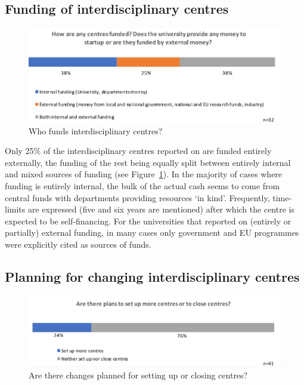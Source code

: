 \subsection{Funding of interdisciplinary centres}

\begin{figure}[h]
\centering
\includegraphics[width = \linewidth]{charts/5e.jpg}
\caption{Who funds interdisciplinary centres?}
\label{sect5:funding}
\end{figure}

Only 25\% of the interdisciplinary centres reported on are funded entirely externally, the funding of the rest being equally split between entirely internal and mixed sources of funding (see Figure~\ref{sect5:funding}). In the majority of cases where funding is entirely internal, the bulk of the actual cash seems to come from central funds with departments providing resources `in kind'. Frequently, time-limits are expressed (five and six years are mentioned) after which the centre is expected to be self-financing. For the universities that reported on (entirely or partially) external funding, in many cases only government and EU programmes were explicitly cited as sources of funds.

\subsection{Planning for changing interdisciplinary centres}

\begin{figure}[h]
\centering
\includegraphics[width = \linewidth]{charts/5f.jpg}
\caption{Are there changes planned for setting up or closing centres?}
\label{sect5:changes}
\end{figure}

